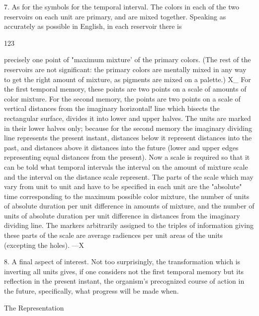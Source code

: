 \documentclass[10pt,twoside]{memoir}
\begin{document}
\begin{enumerate}
{\begin{enumerate}
\begin{sysrules}
\begin{sysrules}
\begin{sysrules}
\begin{sysrules}
{\begin{enumerate}
{{7. As for the symbols for the temporal interval. The colors in each of 
the two reservoirs on each unit are primary, and are mixed together. 
Speaking as accurately as possible in English, in each reservoir there is 


123 


precisely one point of "maximum mixture' of the primary colors. (The rest 
of the reservoirs are not significant: the primary colors are mentally mixed in 
any way to get the right amount of mixture, as pigments are mixed on a 
palette.) X\_ For the first temporal memory, these points are two points on a 
scale of amounts of color mixture. For the second memory, the points are 
two points on a scale of vertical distances from the imaginary horizontal! line 
which bisects the rectangular surface, divides it into lower and upper halves. 
The units are marked in their lower halves only; because for the second 
memory the imaginary dividing line represents the present instant, distances 
below it represent distances into the past, and distances above it distances 
into the future (lower and upper edges representing equal distances from the 
present). Now a scale is required so that it can be told what temporal 
intervals the interval on the amount of mixture scale and the interval on the 
distance scale represent. The parts of the scale which may vary from unit to 
unit and have to be specified in each unit are the "absolute" time 
corresponding to the maximum possible color mixture, the number of units 
of absolute duration per unit difference in amounts of mixture, and the 
number of units of absolute duration per unit difference in distances from 
the imaginary dividing line. The markers arbitrarily assigned to the triples of 
information giving these parts of the scale are average radiences per unit 
areas of the units (excepting the holes). —X 

8. A final aspect of interest. Not too surprisingly, the transformation 
which is inverting all units gives, if one considers not the first temporal 
memory but its reflection in the present instant, the organism's precognized 
course of action in the future, specifically, what progress will be made when. 


The Representation 

}}
\end{enumerate}}
\end{sysrules}
\end{sysrules}
\end{sysrules}
\end{sysrules}
\end{enumerate}}
\end{enumerate}
\end{document}
